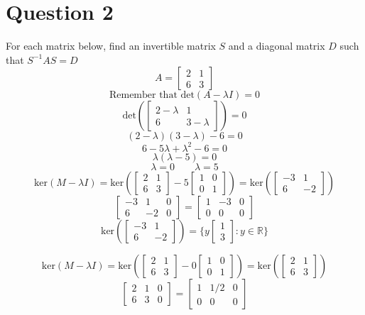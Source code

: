 \documentclass[hidelinks]{article}
\begin{document}
\section{Question 2}
For each matrix below, find an invertible matrix $S$ and a diagonal matrix $D$ such that $S^{-1}AS = D$
\[
	A = \begin{bmatrix} 2 & 1 \\ 6 & 3 \end{bmatrix}

\]
\[
	\text{Remember that det}(A - \lambda I) = 0
\]
\[
	\text{det}(\begin{bmatrix} 2 - \lambda & 1 \\ 6 & 3 - \lambda \end{bmatrix}) = 0
\]
\[
	(2 - \lambda)(3 - \lambda) - 6 = 0
\]
\[
	6 - 5\lambda + \lambda^2 - 6 = 0 
\]
\[
	\lambda(\lambda - 5) = 0
\]
\[
	\lambda = 0 \quad \quad \lambda = 5
\]
\[
	\text{ker}(M - \lambda I) = \text{ker}(\begin{bmatrix} 2 & 1 \\ 6 & 3 \end{bmatrix} - 5\begin{bmatrix} 1 & 0 \\ 0 & 1 \end{bmatrix}) = \text{ker}(\begin{bmatrix} -3 & 1 \\ 6 & -2 \end{bmatrix})
\]
\[ 
	\begin{bmatrix} -3 & 1 & 0 \\ 6 & -2 & 0 \end{bmatrix} = \begin{bmatrix} 1 & -3 & 0  \\ 0 & 0 & 0 \end{bmatrix}
\]
\[
	\text{ker}(\begin{bmatrix} -3 & 1 \\ 6 & -2 \end{bmatrix}) = \{ y \begin{bmatrix} 1 \\ 3\end{bmatrix} : y \in \mathbb{R} \}	
\]

\[
	\text{ker}(M - \lambda I) = \text{ker}(\begin{bmatrix} 2 & 1 \\ 6 & 3 \end{bmatrix} - 0\begin{bmatrix} 1 & 0 \\ 0 & 1 \end{bmatrix}) = \text{ker}(\begin{bmatrix} 2 & 1 \\ 6 & 3 \end{bmatrix})
\]
\[
	\begin{bmatrix} 2 & 1 & 0 \\ 6 & 3 & 0 \end{bmatrix} = \begin{bmatrix} 1 & 1/2 & 0 \\ 0 & 0 & 0 \end{bmatrix}
\]
\end{document}
